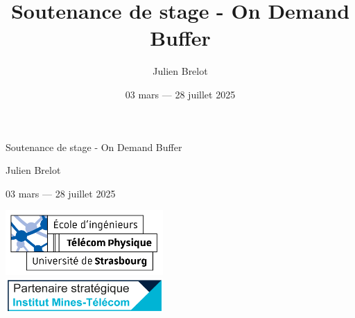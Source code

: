 \documentclass[aspectratio=43,8pt]{beamer}
\title{Soutenance de stage - On Demand Buffer}
\author[Brelot]{Julien Brelot}
\date{ 03 mars — 28 juillet 2025}
\begin{document}

\begin{frame}[plain]
    \centering
    {\Huge Soutenance de stage - On Demand Buffer\par}
    \vspace{0.5cm}
    {\large Julien Brelot\par}
    \vspace{0.5cm}
    {\large 03 mars — 28 juillet 2025\par}
    \vspace{1cm}
        \centering
        \includegraphics[width=0.45\textwidth]{img2/logo-tps.png}
        \\
        \includegraphics[width=0.45\textwidth]{img2/imt.png}
\end{frame}

\end{document}

